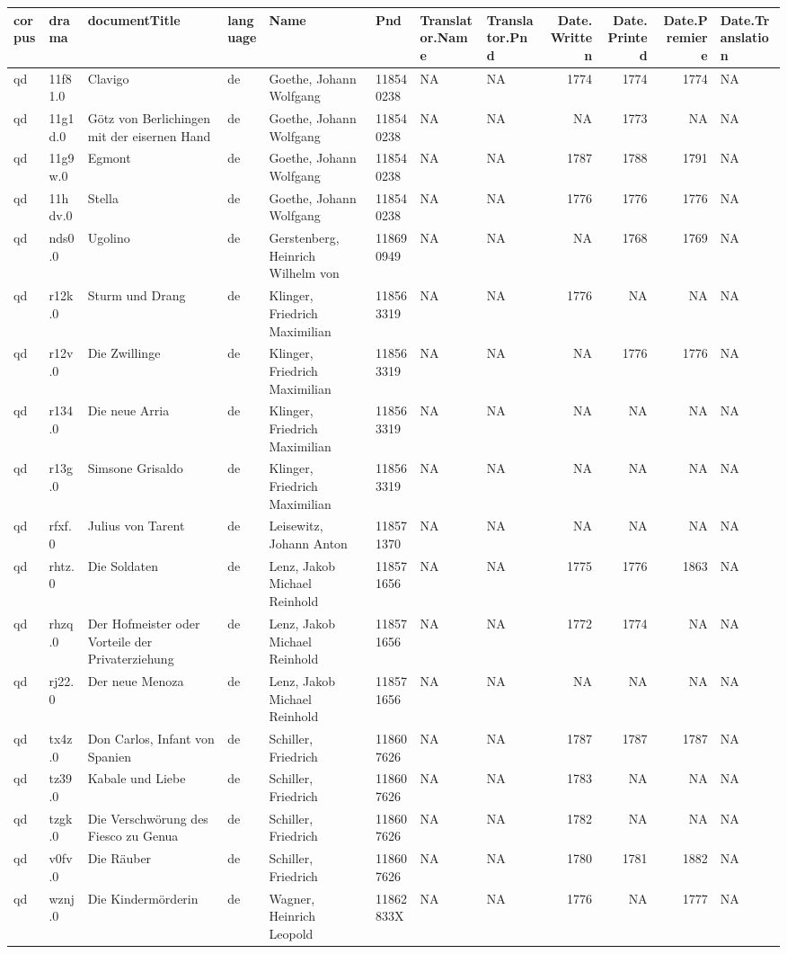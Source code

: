 \documentclass[]{book}
\begin{document}
\begin{tabular}{l|l|l|l|l|l|l|l|r|r|r|l}
\hline
corpus & drama & documentTitle & language & Name & Pnd & Translator.Name & Translator.Pnd & Date.Written & Date.Printed & Date.Premiere & Date.Translation\\
\hline
qd & 11f81.0 & Clavigo & de & Goethe, Johann Wolfgang & 118540238 & NA & NA & 1774 & 1774 & 1774 & NA\\
\hline
qd & 11g1d.0 & Götz von Berlichingen mit der eisernen Hand & de & Goethe, Johann Wolfgang & 118540238 & NA & NA & NA & 1773 & NA & NA\\
\hline
qd & 11g9w.0 & Egmont & de & Goethe, Johann Wolfgang & 118540238 & NA & NA & 1787 & 1788 & 1791 & NA\\
\hline
qd & 11hdv.0 & Stella & de & Goethe, Johann Wolfgang & 118540238 & NA & NA & 1776 & 1776 & 1776 & NA\\
\hline
qd & nds0.0 & Ugolino & de & Gerstenberg, Heinrich Wilhelm von & 118690949 & NA & NA & NA & 1768 & 1769 & NA\\
\hline
qd & r12k.0 & Sturm und Drang & de & Klinger, Friedrich Maximilian & 118563319 & NA & NA & 1776 & NA & NA & NA\\
\hline
qd & r12v.0 & Die Zwillinge & de & Klinger, Friedrich Maximilian & 118563319 & NA & NA & NA & 1776 & 1776 & NA\\
\hline
qd & r134.0 & Die neue Arria & de & Klinger, Friedrich Maximilian & 118563319 & NA & NA & NA & NA & NA & NA\\
\hline
qd & r13g.0 & Simsone Grisaldo & de & Klinger, Friedrich Maximilian & 118563319 & NA & NA & NA & NA & NA & NA\\
\hline
qd & rfxf.0 & Julius von Tarent & de & Leisewitz, Johann Anton & 118571370 & NA & NA & NA & NA & NA & NA\\
\hline
qd & rhtz.0 & Die Soldaten & de & Lenz, Jakob Michael Reinhold & 118571656 & NA & NA & 1775 & 1776 & 1863 & NA\\
\hline
qd & rhzq.0 & Der Hofmeister oder Vorteile der Privaterziehung & de & Lenz, Jakob Michael Reinhold & 118571656 & NA & NA & 1772 & 1774 & NA & NA\\
\hline
qd & rj22.0 & Der neue Menoza & de & Lenz, Jakob Michael Reinhold & 118571656 & NA & NA & NA & NA & NA & NA\\
\hline
qd & tx4z.0 & Don Carlos, Infant von Spanien & de & Schiller, Friedrich & 118607626 & NA & NA & 1787 & 1787 & 1787 & NA\\
\hline
qd & tz39.0 & Kabale und Liebe & de & Schiller, Friedrich & 118607626 & NA & NA & 1783 & NA & NA & NA\\
\hline
qd & tzgk.0 & Die Verschwörung des Fiesco zu Genua & de & Schiller, Friedrich & 118607626 & NA & NA & 1782 & NA & NA & NA\\
\hline
qd & v0fv.0 & Die Räuber & de & Schiller, Friedrich & 118607626 & NA & NA & 1780 & 1781 & 1882 & NA\\
\hline
qd & wznj.0 & Die Kindermörderin & de & Wagner, Heinrich Leopold & 11862833X & NA & NA & 1776 & NA & 1777 & NA\\
\hline
\end{tabular}
\end{document}
